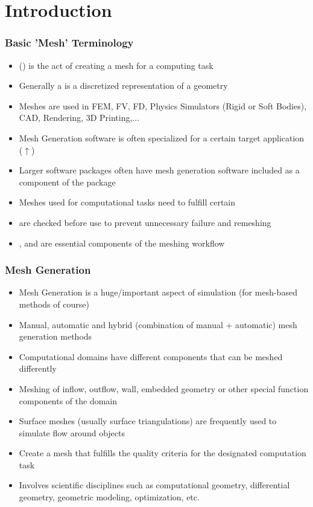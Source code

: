 \section{Introduction}
\begin{frame}
	\frametitle{Basic 'Mesh' Terminology}
  \begin{itemize}
		\item {} () is the act of creating a mesh for a computing task
		\item Generally a  is a discretized representation of a geometry 
		\item Meshes are used in FEM, FV, FD, Physics Simulators (Rigid or Soft Bodies), CAD, Rendering, 3D Printing,...
		\item Mesh Generation software is often specialized for a certain target application ($\uparrow$)
		\item Larger software packages often have mesh generation software included as a component of the package
		\item Meshes used for computational tasks need to fulfill certain 
		\item {} are checked before use to prevent unnecessary failure and remeshing
		\item {},  and  are essential components of the meshing workflow
  \end{itemize}	
\end{frame}

\begin{frame}
	\frametitle{Mesh Generation}
  \begin{itemize}
		\item Mesh Generation is a huge/important aspect of simulation (for mesh-based methods of course)
		\item Manual, automatic and hybrid (combination of manual + automatic) mesh generation methods
		\item Computational domains have different components that can be meshed differently
		\item Meshing of inflow, outflow, wall, embedded geometry or other special function components of the domain
		\item Surface meshes (usually surface triangulations) are frequently used to simulate flow around objects
		\item Create a mesh that fulfills the quality criteria for the designated computation task
		\item Involves scientific disciplines such as computational geometry, differential geometry, geometric modeling, optimization, etc.
  \end{itemize}	
\end{frame}

